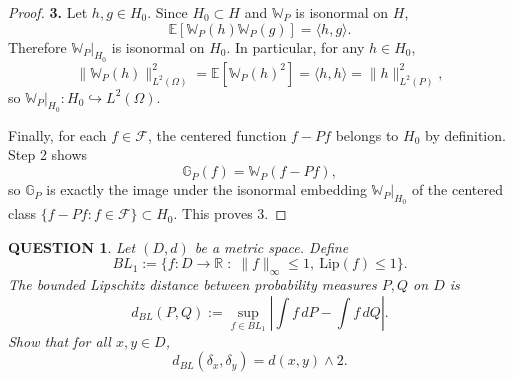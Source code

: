 \documentclass[12pt]{article}
\renewcommand{\(}{\left(}%
\renewcommand{\)}{\right)}%
\renewcommand{\[}{\left[}%
\renewcommand{\]}{\right]}%
\newtheorem{question}{QUESTION}[section]}
\newtheorem{proof}{Proof.}}
\begin{document}
\begin{proof}
\medskip
\noindent
\textbf{3.}
Let $h,g\in H_0$. Since $H_0\subset H$ and $\mathbb W_P$ is isonormal on $H$,
\begin{equation*}
\mathbb E[\mathbb W_P(h)\mathbb W_P(g)]=\langle h,g\rangle.
\end{equation*}
Therefore $\mathbb W_P|_{H_0}$ is isonormal on $H_0$. In particular, for any $h\in H_0$,
\begin{equation*}
\|\mathbb W_P(h)\|_{L^2(\Omega)}^2=\mathbb E[\mathbb W_P(h)^2]=\langle h,h\rangle=\|h\|_{L^2(P)}^2,
\end{equation*}
so $\mathbb W_P|_{H_0} : H_0 \hookrightarrow L^2(\Omega)$.

Finally, for each $f\in\mathcal F$, the centered function $f-Pf$ belongs to $H_0$ by definition. Step 2 shows
\begin{equation*}
\mathbb G_P(f)=\mathbb W_P(f-Pf),
\end{equation*}
so $\mathbb G_P$ is exactly the image under the isonormal embedding $\mathbb W_P|_{H_0}$ of the centered class $\{f-Pf:f\in\mathcal F\}\subset H_0$. This proves 3.
\end{proof}  

\begin{question}
Let $(D,d)$ be a metric space. Define
\begin{equation*}
BL_1 := \{ f : D \to \mathbb{R} \; : \; \|f\|_\infty \le 1, \ \mathrm{Lip}(f) \le 1 \}.
\end{equation*}
The bounded Lipschitz distance between probability measures $P,Q$ on $D$ is
\begin{equation*}
d_{BL}(P,Q) := \sup_{f \in BL_1} \left| \int f \, dP - \int f \, dQ \right|.
\end{equation*}
Show that for all $x,y \in D$,
\begin{equation*}
d_{BL}(\delta_x,\delta_y) = d(x,y) \wedge 2.
\end{equation*}
\end{question}
\end{document}
